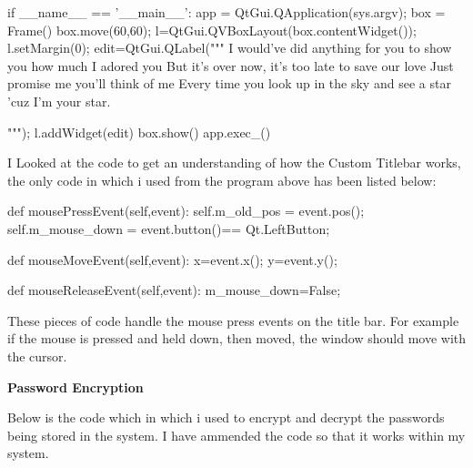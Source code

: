 \begin{python}
if __name__ == '__main__':
    app = QtGui.QApplication(sys.argv);
    box = Frame()
    box.move(60,60);
    l=QtGui.QVBoxLayout(box.contentWidget());
    l.setMargin(0);
    edit=QtGui.QLabel("""
I would've did anything for you to show you how much I adored you
But it's over now, it's too late to save our love
Just promise me you'll think of me
Every time you look up in the sky and see a star 'cuz I'm  your star.

                          """);
    l.addWidget(edit)
    box.show()
    app.exec_()

\end{python}


I Looked at the code to get an understanding of how the Custom Titlebar works, the only code in which i used from the program above has been listed below:

\begin{python}

def mousePressEvent(self,event):
        self.m_old_pos = event.pos();
        self.m_mouse_down = event.button()== Qt.LeftButton;
   
def mouseMoveEvent(self,event):
        x=event.x();
        y=event.y();
        
def mouseReleaseEvent(self,event):
        m_mouse_down=False;

\end{python}

These pieces of code handle the mouse press events on the title bar. For example if the mouse is pressed and held down, then moved, the window should move with the cursor.

\textbf{Password Encryption}

Below is the code which in which i used to encrypt and decrypt the passwords being stored in the system. I have ammended the code so that it works within my system.

